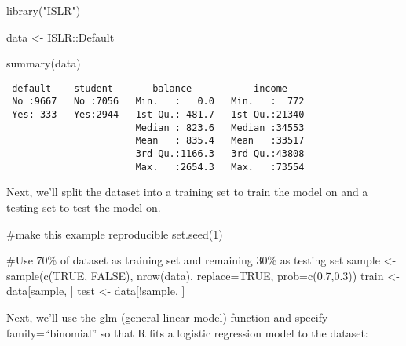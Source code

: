 \documentclass[
  letterpaper,
  DIV=11,
  numbers=noendperiod]{scrreprt}
\newenvironment{Shaded}{\begin{snugshade}}{\end{snugshade}}
\newcommand{\AttributeTok}[1]{\textcolor[rgb]{0.40,0.45,0.13}{#1}}
\newcommand{\CommentTok}[1]{\textcolor[rgb]{0.37,0.37,0.37}{#1}}
\newcommand{\ConstantTok}[1]{\textcolor[rgb]{0.56,0.35,0.01}{#1}}
\newcommand{\DecValTok}[1]{\textcolor[rgb]{0.68,0.00,0.00}{#1}}
\newcommand{\FloatTok}[1]{\textcolor[rgb]{0.68,0.00,0.00}{#1}}
\newcommand{\FunctionTok}[1]{\textcolor[rgb]{0.28,0.35,0.67}{#1}}
\newcommand{\NormalTok}[1]{\textcolor[rgb]{0.00,0.23,0.31}{#1}}
\newcommand{\OtherTok}[1]{\textcolor[rgb]{0.00,0.23,0.31}{#1}}
\newcommand{\SpecialCharTok}[1]{\textcolor[rgb]{0.37,0.37,0.37}{#1}}
\newcommand{\StringTok}[1]{\textcolor[rgb]{0.13,0.47,0.30}{#1}}
\begin{document}
\begin{Shaded}
\begin{Highlighting}[]
\FunctionTok{library}\NormalTok{(}\StringTok{"ISLR"}\NormalTok{)}

\NormalTok{data }\OtherTok{\textless{}{-}}\NormalTok{ ISLR}\SpecialCharTok{::}\NormalTok{Default}

\FunctionTok{summary}\NormalTok{(data)}
\end{Highlighting}
\end{Shaded}

\begin{verbatim}
 default    student       balance           income     
 No :9667   No :7056   Min.   :   0.0   Min.   :  772  
 Yes: 333   Yes:2944   1st Qu.: 481.7   1st Qu.:21340  
                       Median : 823.6   Median :34553  
                       Mean   : 835.4   Mean   :33517  
                       3rd Qu.:1166.3   3rd Qu.:43808  
                       Max.   :2654.3   Max.   :73554  
\end{verbatim}

Next, we'll split the dataset into a training set to train the model on
and a testing set to test the model on.

\begin{Shaded}
\begin{Highlighting}[]
\CommentTok{\#make this example reproducible}
\FunctionTok{set.seed}\NormalTok{(}\DecValTok{1}\NormalTok{)}

\CommentTok{\#Use 70\% of dataset as training set and remaining 30\% as testing set}
\NormalTok{sample }\OtherTok{\textless{}{-}} \FunctionTok{sample}\NormalTok{(}\FunctionTok{c}\NormalTok{(}\ConstantTok{TRUE}\NormalTok{, }\ConstantTok{FALSE}\NormalTok{), }\FunctionTok{nrow}\NormalTok{(data), }\AttributeTok{replace=}\ConstantTok{TRUE}\NormalTok{, }\AttributeTok{prob=}\FunctionTok{c}\NormalTok{(}\FloatTok{0.7}\NormalTok{,}\FloatTok{0.3}\NormalTok{))}
\NormalTok{train }\OtherTok{\textless{}{-}}\NormalTok{ data[sample, ]}
\NormalTok{test }\OtherTok{\textless{}{-}}\NormalTok{ data[}\SpecialCharTok{!}\NormalTok{sample, ]   }
\end{Highlighting}
\end{Shaded}

Next, we'll use the glm (general linear model) function and specify
family=``binomial'' so that R fits a logistic regression model to the
dataset:
\end{document}
